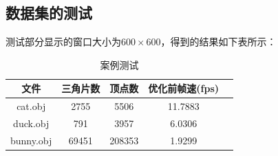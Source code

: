 \documentclass[10pt]{article}
\begin{document}
\subsection{数据集的测试}
测试部分显示的窗口大小为$600\times600$，得到的结果如下表所示：
\begin{table}[H]
\caption{案例测试}
\begin{center}
\begin{tabular}{ccccc}
\toprule  %
文件&三角片数&顶点数&优化前帧速(fps)\\
\midrule  %
cat.obj&2755&5506&11.7883 \\
duck.obj&791&3957& 6.0306\\
bunny.obj&69451&208353&1.9299\\
\bottomrule %
\end{tabular}
\end{center}
\end{table}
\end{document}
